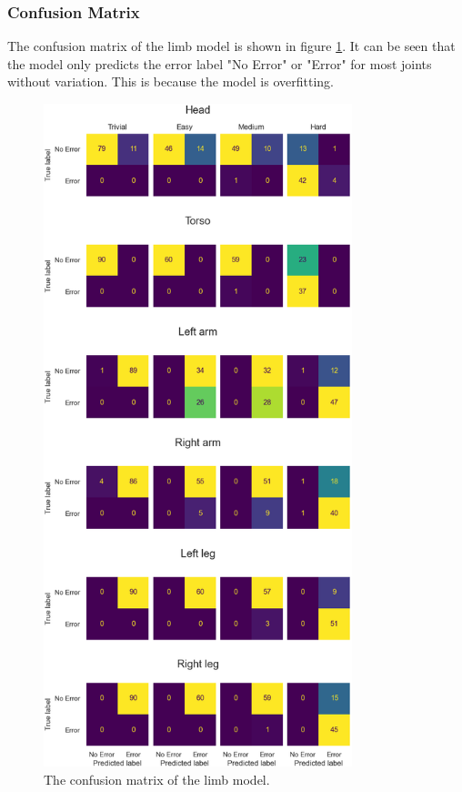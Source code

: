 \subsubsection{Confusion Matrix}

The confusion matrix of the limb model is shown in figure \ref{fig:limb_confusion_matrix}. It can be seen that the model only predicts the error label "No Error" or "Error" for most joints without variation. This is because the model is overfitting.

\begin{figure}
  \centering
  \includegraphics[width=0.8\textwidth]{figures/results/confusion/limbs.png}
  \caption[Limb model confusion matrix]{The confusion matrix of the limb model.}
  \label{fig:limb_confusion_matrix}
\end{figure}

